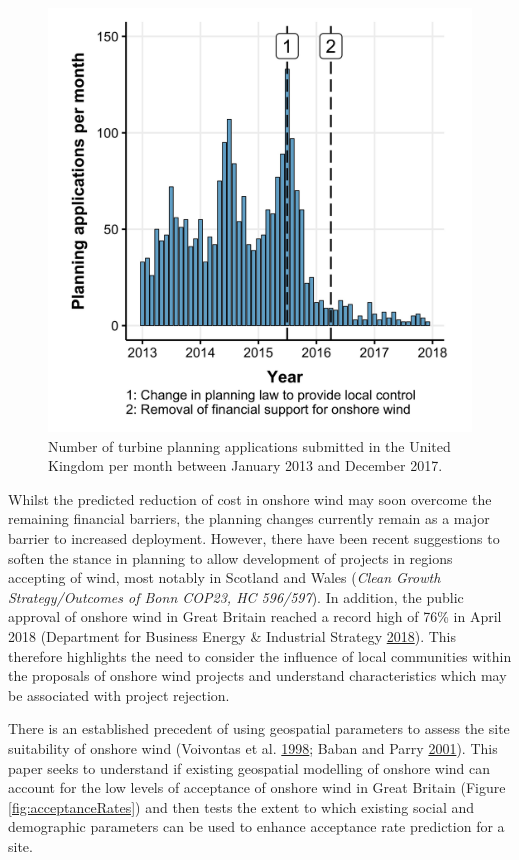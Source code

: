 \documentclass[a4paper,]{article}
\theoremstyle{definition}
\theoremstyle{definition}
\theoremstyle{definition}
\theoremstyle{remark}
\begin{document}
\begin{figure}[h]

{\centering \includegraphics[width=0.5\linewidth]{figures/figure2} 

}

\caption{Number of turbine planning applications
submitted in the United Kingdom per month between January 2013 and
December 2017.}\label{fig:numberApplications}
\end{figure}

Whilst the predicted reduction of cost in onshore wind may soon overcome
the remaining financial barriers, the planning changes currently remain
as a major barrier to increased deployment. However, there have been
recent suggestions to soften the stance in planning to allow development
of projects in regions accepting of wind, most notably in Scotland and
Wales (\emph{Clean Growth Strategy/Outcomes of Bonn COP23, HC 596/597}).
In addition, the public approval of onshore wind in Great Britain
reached a record high of 76\% in April 2018 (Department for Business
Energy \& Industrial Strategy \protect\hyperlink{ref-DBIES2018}{2018}).
This therefore highlights the need to consider the influence of local
communities within the proposals of onshore wind projects and understand
characteristics which may be associated with project rejection.

There is an established precedent of using geospatial parameters to
assess the site suitability of onshore wind (Voivontas et al.
\protect\hyperlink{ref-Voivontas1998}{1998}; Baban and Parry
\protect\hyperlink{ref-Baban2001}{2001}). This paper seeks to understand
if existing geospatial modelling of onshore wind can account for the low
levels of acceptance of onshore wind in Great Britain (Figure
\ref{fig:acceptanceRates}) and then tests the extent to which existing
social and demographic parameters can be used to enhance acceptance rate
prediction for a site.
\end{document}
